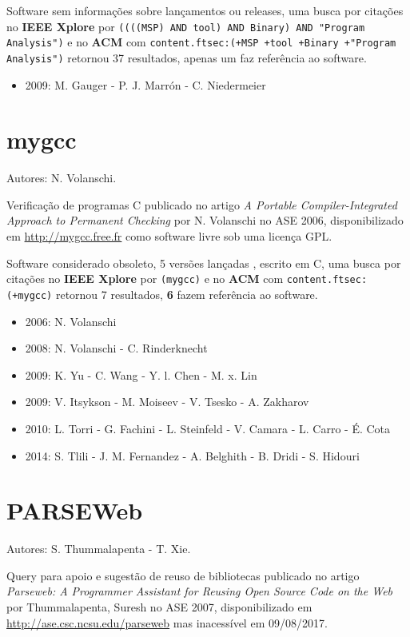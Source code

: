 Software sem informações sobre lançamentos ou releases,
uma busca por citações no {\bf IEEE Xplore} por
\texttt{((((MSP) AND tool) AND Binary) AND "Program Analysis")}
e no {\bf ACM} com
\texttt{content.ftsec:(+MSP +tool +Binary +"Program Analysis")}
retornou
37 resultados,
apenas um faz referência ao software.

\begin{itemize}
\item 2009: M. Gauger - P. J. Marrón - C. Niedermeier
\end{itemize}

\section{mygcc}

Autores:
N. Volanschi.

Verificação de programas C
publicado no artigo {\it A Portable Compiler-Integrated Approach to Permanent Checking}
por N. Volanschi
no ASE 2006,
disponibilizado em \url{http://mygcc.free.fr}
como software livre
sob uma licença GPL.

Software considerado obsoleto,
5 versões lançadas
,
escrito em C,
uma busca por citações no {\bf IEEE Xplore} por
\texttt{(mygcc)}
e no {\bf ACM} com
\texttt{content.ftsec:(+mygcc)}
retornou
7 resultados,
{\bf 6} fazem referência ao software.

\begin{itemize}
\item 2006: N. Volanschi
\item 2008: N. Volanschi - C. Rinderknecht
\item 2009: K. Yu - C. Wang - Y. l. Chen - M. x. Lin
\item 2009: V. Itsykson - M. Moiseev - V. Tsesko - A. Zakharov
\item 2010: L. Torri - G. Fachini - L. Steinfeld - V. Camara - L. Carro - É. Cota
\item 2014: S. Tlili - J. M. Fernandez - A. Belghith - B. Dridi - S. Hidouri
\end{itemize}

\section{PARSEWeb}

Autores:
S. Thummalapenta - T. Xie.

Query para apoio e sugestão de reuso de bibliotecas
publicado no artigo {\it Parseweb: A Programmer Assistant for Reusing Open Source Code on the Web}
por Thummalapenta, Suresh
no ASE 2007,
disponibilizado em \url{http://ase.csc.ncsu.edu/parseweb}
mas inacessível em 09/08/2017.

